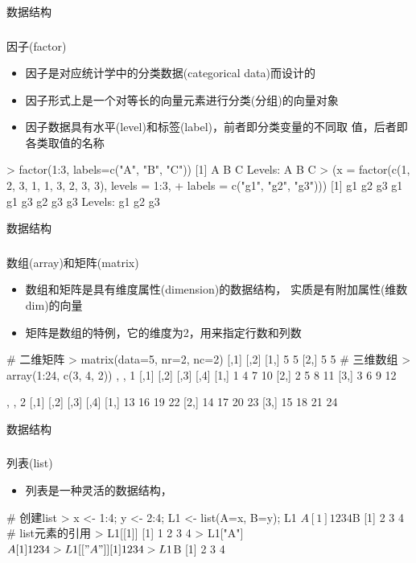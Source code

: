 \begin{frame}[t,fragile]{\subsecname}{数据结构}
  \frametitle{}{因子(factor)}
  \begin{itemize}
  \item 因子是对应统计学中的分类数据(categorical data)而设计的
  \item 因子形式上是一个对等长的向量元素进行分类(分组)的向量对象
  \item 因子数据具有水平(level)和标签(label)，前者即分类变量的不同取
值，后者即各类取值的名称
  \end{itemize}  

\begin{rcode}
> factor(1:3, labels=c("A", "B", "C"))
[1] A B C
Levels: A B C
> (x = factor(c(1, 2, 3, 1, 1, 3, 2, 3, 3), levels = 1:3,
+   labels = c("g1", "g2", "g3")))
[1] g1 g2 g3 g1 g1 g3 g2 g3 g3
Levels: g1 g2 g3
\end{rcode}  
\end{frame}

\begin{frame}[t,fragile]{\subsecname}{数据结构}
  \frametitle{}{数组(array)和矩阵(matrix)}
  \begin{itemize}
  \item 数组和矩阵是具有维度属性(dimension)的数据结构，
        实质是有附加属性(维数dim)的向量
  \item 矩阵是数组的特例，它的维度为2，用来指定行数和列数
  \end{itemize}  

\begin{rcode}
# 二维矩阵
> matrix(data=5, nr=2, nc=2)
     [,1] [,2]
[1,]    5    5
[2,]    5    5
# 三维数组
> array(1:24, c(3, 4, 2))
, , 1
     [,1] [,2] [,3] [,4]
[1,]    1    4    7   10
[2,]    2    5    8   11
[3,]    3    6    9   12

, , 2
     [,1] [,2] [,3] [,4]
[1,]   13   16   19   22
[2,]   14   17   20   23
[3,]   15   18   21   24
\end{rcode}  
\end{frame}

\begin{frame}[t,fragile]{\subsecname}{数据结构}
  \frametitle{}{列表(list)}
  \begin{itemize}
  \item 列表是一种灵活的数据结构，
  \end{itemize}  

\begin{rcode}
# 创建list
> x <- 1:4; y <- 2:4; L1 <- list(A=x, B=y); L1
$A
[1] 1 2 3 4

$B
[1] 2 3 4
# list元素的引用
> L1[[1]]
[1] 1 2 3 4
> L1["A"]
$A
[1] 1 2 3 4
> L1[["A"]]
[1] 1 2 3 4
> L1$B
[1] 2 3 4
\end{rcode}  
\end{frame}

